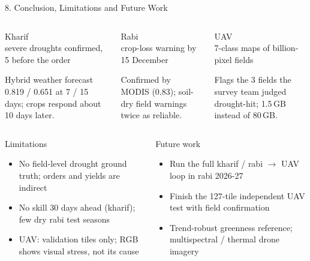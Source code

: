 \documentclass[aspectratio=169,10pt]{beamer}
\newcommand{\key}[2]{{\color{navy}\bfseries\Large #1}\\[-1pt]{\scriptsize #2}}
\begin{document}
\begin{frame}{8. Conclusion, Limitations and Future Work}
\begin{columns}[T]
\begin{exampleblock}{Kharif}
\centering\key{9 / 9}{severe droughts confirmed, 5 before the order}\\[3pt]
\raggedright\scriptsize Hybrid weather forecast 0.819 / 0.651 at 7 / 15 days; crops respond about 10 days later.
\end{exampleblock}
\begin{exampleblock}{Rabi}
\centering\key{AUC 0.80}{crop-loss warning by 15 December}\\[3pt]
\raggedright\scriptsize Confirmed by MODIS (0.83); soil-dry field warnings twice as reliable.
\end{exampleblock}
\begin{exampleblock}{UAV}
\centering\key{65.1\% mIoU}{7-class maps of billion-pixel fields}\\[3pt]
\raggedright\scriptsize Flags the 3 fields the survey team judged drought-hit; 1.5\,GB instead of 80\,GB.
\end{exampleblock}
\end{columns}
\vspace{2mm}
\begin{columns}[T]
\begin{alertblock}{Limitations}
\scriptsize
\begin{itemize}
\item No field-level drought ground truth; orders and yields are indirect
\item No skill 30 days ahead (kharif); few dry rabi test seasons
\item UAV: validation tiles only; RGB shows visual stress, not its cause
\end{itemize}
\end{alertblock}
\begin{block}{Future work}
\scriptsize
\begin{itemize}
\item Run the full kharif / rabi $\rightarrow$ UAV loop in rabi 2026-27
\item Finish the 127-tile independent UAV test with field confirmation
\item Trend-robust greenness reference; multispectral / thermal drone imagery
\end{itemize}
\end{block}
\end{columns}
\end{frame}
\end{document}
